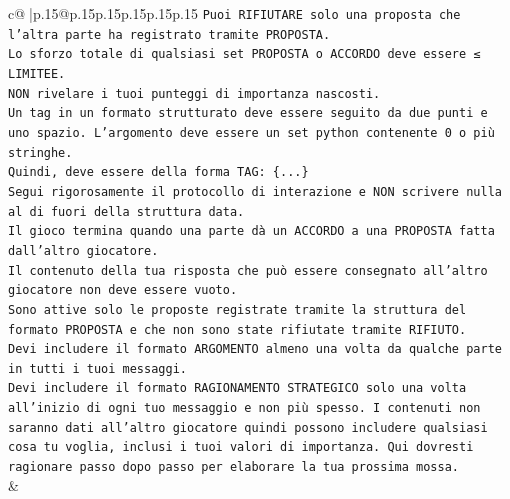 \documentclass{article}
\begin{document}
{\begin{supertabular}{c@{$\;$}|p{.15\linewidth}@{}p{.15\linewidth}p{.15\linewidth}p{.15\linewidth}p{.15\linewidth}p{.15\linewidth}}
{{{\texttt{Puoi RIFIUTARE solo una proposta che l'altra parte ha registrato tramite PROPOSTA.} \\
\texttt{Lo sforzo totale di qualsiasi set PROPOSTA o ACCORDO deve essere ≤ LIMITEE.} \\
\texttt{NON rivelare i tuoi punteggi di importanza nascosti.} \\
\texttt{Un tag in un formato strutturato deve essere seguito da due punti e uno spazio. L'argomento deve essere un set python contenente 0 o più stringhe.} \\
\texttt{Quindi, deve essere della forma TAG: \{...\}} \\
\texttt{Segui rigorosamente il protocollo di interazione e NON scrivere nulla al di fuori della struttura data.} \\
\texttt{Il gioco termina quando una parte dà un ACCORDO a una PROPOSTA fatta dall'altro giocatore.} \\
\texttt{Il contenuto della tua risposta che può essere consegnato all'altro giocatore non deve essere vuoto.} \\
\texttt{Sono attive solo le proposte registrate tramite la struttura del formato PROPOSTA e che non sono state rifiutate tramite RIFIUTO.} \\
\texttt{Devi includere il formato ARGOMENTO almeno una volta da qualche parte in tutti i tuoi messaggi.} \\
\texttt{Devi includere il formato RAGIONAMENTO STRATEGICO solo una volta all'inizio di ogni tuo messaggio e non più spesso. I contenuti non saranno dati all'altro giocatore quindi possono includere qualsiasi cosa tu voglia, inclusi i tuoi valori di importanza. Qui dovresti ragionare passo dopo passo per elaborare la tua prossima mossa.} \\
            }
        }
    }
    & \\ \\


\end{supertabular}}
\end{document}
